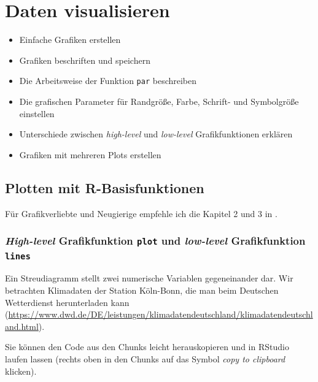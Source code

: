 \documentclass[]{book}
\providecommand{\tightlist}{%
  \setlength{\itemsep}{0pt}\setlength{\parskip}{0pt}}
\newenvironment{rmdoutcomes}{
  \definecolor{outcomes}{rgb}{1.0, 0.92, 0.8}  %
  \color{black}
  \begin{mdframed}[backgroundcolor = outcomes]}
 {\end{mdframed}}
\begin{document}
\hypertarget{visualisieren}{%
\chapter{Daten visualisieren}\label{visualisieren}}

\begin{rmdoutcomes}
\begin{itemize}
\tightlist
\item
  Einfache Grafiken erstellen
\item
  Grafiken beschriften und speichern
\item
  Die Arbeitsweise der Funktion \texttt{par} beschreiben
\item
  Die grafischen Parameter für Randgröße, Farbe, Schrift- und
  Symbolgröße einstellen
\item
  Unterschiede zwischen \emph{high-level} und \emph{low-level}
  Grafikfunktionen erklären
\item
  Grafiken mit mehreren Plots erstellen
\end{itemize}
\end{rmdoutcomes}

\hypertarget{plotten-mit-r-basisfunktionen}{%
\section{Plotten mit R-Basisfunktionen}\label{plotten-mit-r-basisfunktionen}}

Für Grafikverliebte und Neugierige empfehle ich die Kapitel 2 und 3 in \citet{Murrell2006}.

\hypertarget{high-level-grafikfunktion-plot-und-low-level-grafikfunktion-lines}{%
\subsection{\texorpdfstring{\emph{High-level} Grafikfunktion \texttt{plot} und \emph{low-level} Grafikfunktion \texttt{lines}}{High-level Grafikfunktion plot und low-level Grafikfunktion lines}}\label{high-level-grafikfunktion-plot-und-low-level-grafikfunktion-lines}}

Ein Streudiagramm stellt zwei numerische Variablen gegeneinander dar. Wir betrachten Klimadaten der Station Köln-Bonn, die man beim Deutschen Wetterdienst herunterladen kann (\url{https://www.dwd.de/DE/leistungen/klimadatendeutschland/klimadatendeutschland.html}).

Sie können den Code aus den Chunks leicht herauskopieren und in RStudio laufen lassen (rechts oben in den Chunks auf das Symbol \emph{copy to clipboard} klicken).
\end{document}
